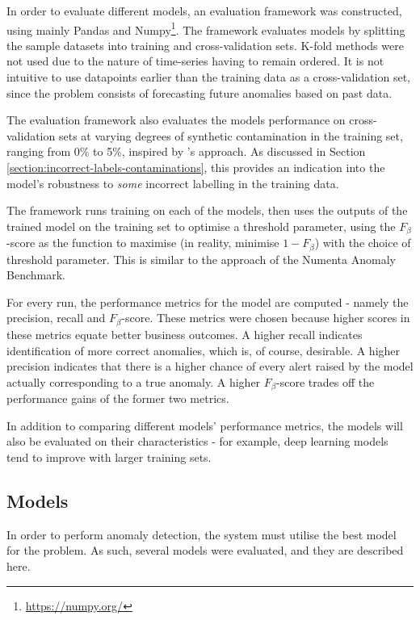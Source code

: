 \documentclass{mpaper}
\begin{document}
In order to evaluate different models, an evaluation framework was constructed, using mainly Pandas and Numpy\footnote{\url{https://numpy.org/}}. The framework evaluates models by splitting the sample datasets into training and cross-validation sets. K-fold methods were not used due to the nature of time-series having to remain ordered. It is not intuitive to use datapoints earlier than the training data as a cross-validation set, since the problem consists of forecasting future anomalies based on past data.

The evaluation framework also evaluates the models performance on cross-validation sets at varying degrees of synthetic contamination in the training set, ranging from 0\% to 5\%, inspired by \cite{DAGMM}'s approach. As discussed in Section \ref{section:incorrect-labels-contaminations}, this provides an indication into the model's robustness to \textit{some} incorrect labelling in the training data.

The framework runs training on each of the models, then uses the outputs of the trained model on the training set to optimise a threshold parameter, using the $F_\beta$-score as the function to maximise (in reality, minimise $1 - F_\beta$) with the choice of threshold parameter. This is similar to the approach of the Numenta Anomaly Benchmark.

For every run, the performance metrics for the model are computed - namely the precision, recall and $F_\beta$-score. These metrics were chosen because higher scores in these metrics equate better business outcomes. A higher recall indicates identification of more correct anomalies, which is, of course, desirable. A higher precision indicates that there is a higher chance of every alert raised by the model actually corresponding to a true anomaly. A higher $F_\beta$-score trades off the performance gains of the former two metrics.

In addition to comparing different models' performance metrics, the models will also be evaluated on their characteristics - for example, deep learning models tend to improve with larger training sets.

\subsection{Models}

In order to perform anomaly detection, the system must utilise the best model for the problem. As such, several models were evaluated, and they are described here. 
\end{document}
